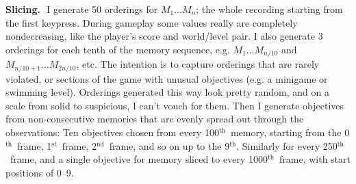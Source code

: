 \documentclass[twocolumn]{article}
\newcommand\st{$^{\mathrm{st}}$}
\newcommand\nd{$^{\mathrm{nd}}$}
\renewcommand\th{$^{\mathrm{th}}$}
\begin{document}
{\bf Slicing.}\,\, I generate 50 orderings for $M_1 \ldots M_n$; the
whole recording starting from the first keypress. During gameplay some
values really are completely nondecreasing, like the player's score
and world/level pair. I also generate 3 orderings for each tenth of
the memory sequence, e.g. $M_1 \ldots M_{n/10}$ and $M_{n/10+1} \ldots
M_{2n/10}$, etc. The intention is to capture orderings that are rarely
violated, or sections of the game with unusual objectives (e.g. a
minigame or swimming level). Orderings generated this way look pretty
random, and on a scale from solid to suspicious, I can't vouch for
them. Then I generate objectives from non-consecutive memories that
are evenly spread out through the observations: Ten objectives
chosen from every 100\th\ memory, starting from the 0\th\ frame,
1\st\ frame, 2\nd\ frame, and so on up to the 9\th{}. Similarly
for every 250\th\ frame, and a single objective for memory sliced
to every 1000\th\ frame, with start positions of 0--9.
\end{document}

